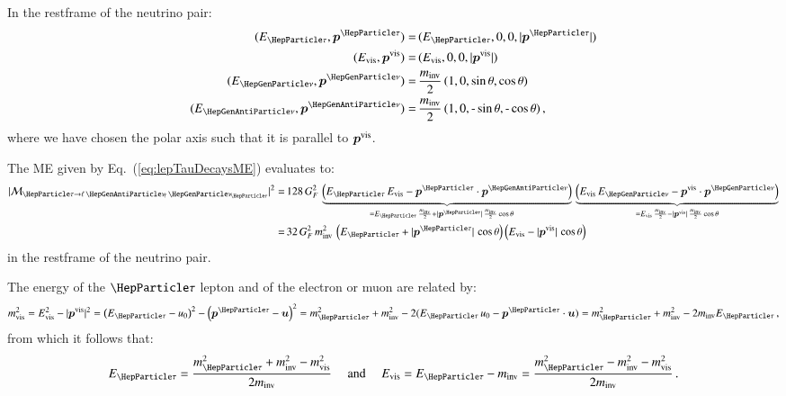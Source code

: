 In the restframe of the neutrino pair:
\begin{align}
( E_{\Pgt}, \bm{p}^{\Pgt} ) = & \, ( E_{\Pgt}, 0, 0, \vert\bm{p}^{\Pgt}\vert ) \nonumber \\
( E_{\vis}, \bm{p}^{\vis} ) = & \, ( E_{\vis}, 0, 0, \vert\bm{p}^{\vis}\vert ) \nonumber \\
( E_{\Pnu}, \bm{p}^{\Pnu} ) = & \, \frac{m_{\inv}}{2} \, ( 1, 0, \sin\theta, \cos\theta ) \nonumber \\
( E_{\APnu}, \bm{p}^{\APnu} ) = & \, \frac{m_{\inv}}{2} \, ( 1, 0, \mbox{-}\sin\theta, \mbox{-}\cos\theta ) \, , \nonumber 
\end{align}
where we have chosen the polar axis such that it is parallel to $\bm{p}^{\textrm{vis}}$.

The ME given by Eq.~(\ref{eq:lepTauDecaysME}) evaluates to:
\begin{align}
\vert\mathcal{M}_{\Pgt \to \ellnunu}\vert^{2} 
 = & \, 128 \, G^{2}_{F} \, 
  \underbrace{\left( E_{\Pgt} \, E_{\vis} - \bm{p}^{\Pgt} \cdot \bm{p}^{\APnu} \right)}_{= E_{\Pgt} \, \frac{m_{\inv}}{2} + \vert\bm{p}^{\Pgt}\vert \, \frac{m_{\inv}}{2} \cos\theta \quad} \,
  \underbrace{\left( E_{\vis} \, E_{\Pnu} - \bm{p}^{\vis} \cdot \bm{p}^{\Pnu} \right)}_{= E_{\vis} \, \frac{m_{\inv}}{2} - \vert\bm{p}^{\vis}\vert \, \frac{m_{\inv}}{2} \cos\theta} \nonumber \\
 = & \, 32 \, G^{2}_{F} \, m^{2}_{\inv} \, \left( E_{\Pgt} + \vert\bm{p}^{\Pgt}\vert \, \cos\theta \right)  \left( E_{\vis} - \vert\bm{p}^{\vis}\vert \, \cos\theta \right) 
\label{eq:lepTauDecaysMErf}
\end{align}
in the restframe of the neutrino pair.

The energy of the $\Pgt$ lepton and of the electron or muon are
related by:
\begin{equation}
m^{2}_{\vis} = E_{\vis}^{2} - \vert\bm{p}^{\vis}\vert^{2} = \left(
  E_{\Pgt} - u_{0} \right)^{2} - \left( \bm{p}^{\Pgt} - \bm{u} \right)^{2} 
  = m^{2}_{\Pgt} + m^{2}_{\inv} - 2 (E_{\Pgt} \, u_{0} - \bm{p}^{\Pgt} \cdot \bm{u}) 
  = m^{2}_{\Pgt} + m^{2}_{\inv} - 2 m_{\inv} E_{\Pgt} \, ,
\end{equation}
from which it follows that:
\begin{equation}
E_{\Pgt} = \frac{m^{2}_{\Pgt} + m^{2}_{\inv} - m^{2}_{\vis}}{2
  m_{\inv}} \quad \mbox{ and } \quad E_{\vis} = E_{\Pgt} - m_{\inv} =
\frac{m^{2}_{\Pgt} - m^{2}_{\inv} - m^{2}_{\vis}}{2 m_{\inv}} \, .
\label{eq:lepTauDecaysEn}
\end{equation}

